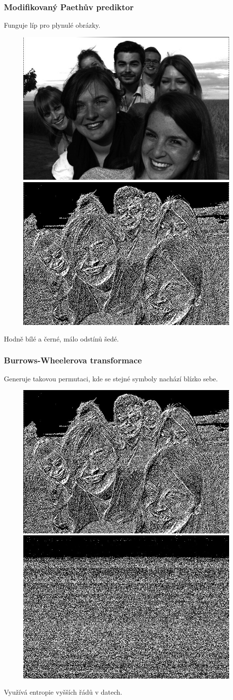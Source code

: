 \documentclass{beamer}
\begin{document}
\begin{frame}
  \center
  \frametitle{Modifikovaný Paethův prediktor}
  Funguje líp pro plynulé obrázky.\\[1em]
  \begin{figure}
  \includegraphics[width=.4\textwidth]{friends_green.jpg}
  \includegraphics[width=.4\textwidth]{friends_green_pred.jpg}
  \end{figure}
  Hodně bílé a černé, málo odstínů šedé.
\end{frame}

\begin{frame}
  \center
  \frametitle{Burrows-Wheelerova transformace}
  Generuje takovou permutaci, kde se stejné symboly nachází blízko sebe.\\[1em]
  \begin{figure}
  \includegraphics[width=.4\textwidth]{friends_green_pred.jpg}
  \includegraphics[width=.4\textwidth]{friends_bwt.jpg}
  \end{figure}
  Využívá entropie vyšších řádů v datech.
\end{frame}
\end{document}
